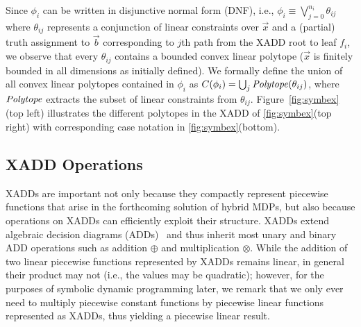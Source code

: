 %

%
Since $\phi_i$ can be written in disjunctive normal form (DNF), i.e.,
$\phi_i \equiv \bigvee_{j=0}^{n_i} \theta_{ij}$ where $\theta_{ij}$
represents a conjunction of linear constraints over $\vec{x}$ and a
(partial) truth assignment to $\vec{b}$ corresponding to $j$th path
from the XADD root to leaf $f_i$, we observe that every
$\theta_{ij}$ contains a bounded convex linear polytope ($\vec{x}$ is
finitely bounded in all dimensions as initially defined).  
We formally define the union of all convex linear polytopes contained in 
$\phi_i$ as
$C(\phi_i) = \bigcup_j \mathit{Polytope}(\theta_{ij})$, 
where $\mathit{Polytope}$ extracts the subset of linear constraints from
$\theta_{ij}$. Figure~\ref{fig:symbex}(top left) illustrates the different
polytopes in the XADD of \ref{fig:symbex}(top right) with
corresponding case notation in \ref{fig:symbex}(bottom).

\subsection{XADD Operations} 

XADDs are important not only because they compactly represent
piecewise functions that arise in the forthcoming solution of hybrid
MDPs, but also because operations on XADDs can efficiently exploit
their structure.  XADDs extend algebraic decision diagrams
(ADDs)~\cite{bahar93add} and thus inherit most unary and binary ADD
operations such as addition $\oplus$ and multiplication $\otimes$.
While the addition of two linear piecewise functions represented by
XADDs remains linear, in general their product may not (i.e., the values
may be quadratic); however, for the purposes of symbolic dynamic
programming later, we remark that we only ever need to multiply
piecewise constant functions by piecewise linear functions
represented as XADDs, thus yielding a piecewise linear result.

